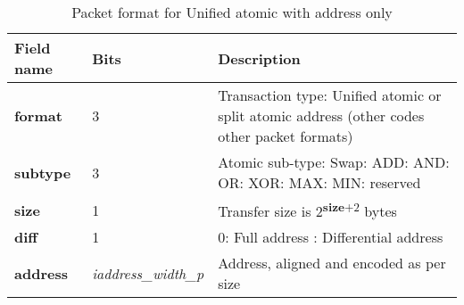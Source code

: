 \begin{table}[htp]
  \centering
  \caption{Packet format for Unified atomic with address only}
  \label{tab:te_datadx0y6}
  \begin{tabulary}{\textwidth}{|l|p{40mm}|p{90mm}|}
    \hline
    {\bf Field name} & {\bf Bits} & {\bf Description} \\
    \hline
    \textbf{format} & 	3	& Transaction type: Unified atomic or split atomic address\newline	
		(other codes other packet formats)\\
    \hline
    \textbf{subtype} & 	3	& Atomic sub-type: Swap: ADD: AND: OR: XOR: MAX: MIN: reserved\\	
    \hline
    \textbf{size} & 1 & Transfer size is 2\textsuperscript{\textbf{size}+2} bytes\\
    \hline
    \textbf{diff} & 1 & 0: Full address : Differential address\\
    \hline
    \textbf{address} &  \textit{iaddress\_width\_p} & Address, aligned and encoded as per size \\
    \hline
  \end{tabulary}
\end{table}



